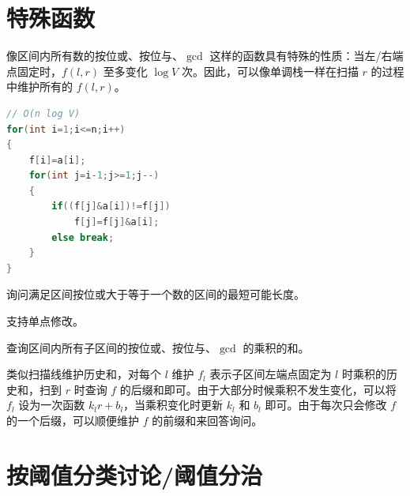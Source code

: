 \section{特殊函数}

像区间内所有数的按位或、按位与、$\gcd$ 这样的函数具有特殊的性质：当左/右端点固定时，$f(l,r)$ 至多变化 $\log V$ 次。因此，可以像单调栈一样在扫描 $r$ 的过程中维护所有的 $f(l,r)$。

\begin{lstlisting}[language=C++]
// O(n log V)
for(int i=1;i<=n;i++)
{
    f[i]=a[i];
    for(int j=i-1;j>=1;j--)
    {
        if((f[j]&a[i])!=f[j])
            f[j]=f[j]&a[i];
        else break;
    }
}
\end{lstlisting}

\begin{example}
    询问满足区间按位或大于等于一个数的区间的最短可能长度。
\end{example}
\begin{solution}
\end{solution}
\begin{exercise}[P5065]
    支持单点修改。
\end{exercise}
\begin{solution}
\end{solution}

\begin{example}[P9335]
    查询区间内所有子区间的按位或、按位与、$\gcd$ 的乘积的和。
\end{example}
\begin{solution}
    类似扫描线维护历史和，对每个 $l$ 维护 $f_l$ 表示子区间左端点固定为 $l$ 时乘积的历史和，扫到 $r$ 时查询 $f$ 的后缀和即可。由于大部分时候乘积不发生变化，可以将 $f_l$ 设为一次函数 $k_l r+b_l$，当乘积变化时更新 $k_l$ 和 $b_l$ 即可。由于每次只会修改 $f$ 的一个后缀，可以顺便维护 $f$ 的前缀和来回答询问。
\end{solution}



\section{按阈值分类讨论/阈值分治}


